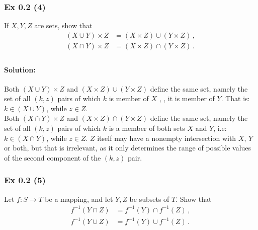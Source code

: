 \subsubsection{Ex 0.2 (4)}\label{sec:Ex_0.2.4}
If $X, Y, Z$ are sets, show that
\begin{align*}
(X \cup Y) \times Z &= (X \times Z) \cup (Y \times Z)\,,\\ 
(X \cap Y) \times Z &= (X \times Z) \cap (Y \times Z)\,.\\ 
\end{align*}

\paragraph{Solution:}{
Both $(X \cup Y) \times Z$ and $(X \times Z) \cup (Y \times Z)$ define the same set, namely the set of all $(k,z)$ pairs of which $k$ is member of $X$ , , it is member of $Y$. That is: $k \in (X \cup Y)$, while $z \in Z$. \\

Both $(X \cap Y) \times Z$ and $(X \times Z) \cap (Y \times Z)$ define the same set, namely the set of all $(k,z)$ pairs of which $k$ is a member of both sets $X$ and $Y$, i.e: $k \in (X \cap Y)$, while $z \in Z$. $Z$ itself may have a nonempty intersection with $X$, $Y$ or both, but that is irrelevant, as it only determines the range of possible values of the second component of the $(k, z)$ pair.
}	%

\subsubsection{Ex 0.2 (5)}\label{sec:Ex_0.2.5}
Let $f : S \rightarrow T$ be a mapping, and let $Y, Z$ be subsets of $T$. Show that 
\begin{align*}
f^{-1}(Y \cap Z) &= f^{-1}(Y) \cap f^{-1}(Z)\,,\\ 
f^{-1}(Y \cup Z) &= f^{-1}(Y) \cup f^{-1}(Z)\,.\\ 
\end{align*}


